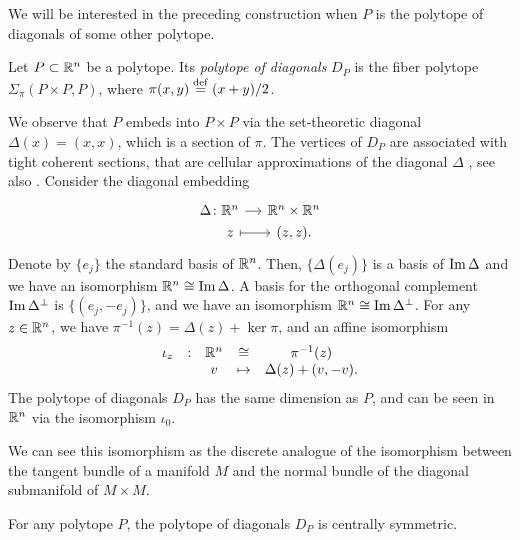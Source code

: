 We will be interested in the preceding construction when $P$ is the polytope of diagonals of some other polytope. 

\begin{definition}
    Let $P\subset \mathbb{R}^n$ be a polytope. 
    Its \emph{polytope of diagonals} $D_P$ is the fiber polytope $\Sigma_\pi(P\times P, P)$, where $\pi(x,y)\stackrel{\mathrm{def}}{=} (x+y)/2$.
\end{definition}

We observe that $P$ embeds into $P\times P$ via the set-theoretic diagonal $\Delta (x)=(x,x)$, which is a section of $\pi$. 
The vertices of $D_P$ are associated with tight coherent sections, that are cellular approximations of the diagonal $\Delta$ \cite[Proposition 5]{MTTV19}, see also \cite[Proposition 1.1]{GLA21}. 
Consider the diagonal embedding
\[
\begin{tikzcd}[row sep=0, column sep=small]
\Delta \colon \R^n \arrow{r} & \R^n \times \R^n \\
\phantom{\Delta \colon} z \arrow[r, |->] & (z,z).
\end{tikzcd}
\]
Denote by $\{e_j\}$ the standard basis of $\mathbb{R}^n$. 
Then, $\{\Delta (e_j)\}$ is a basis of $\operatorname{\mathrm{Im}} \Delta$ and we have an isomorphism $\mathbb{R}^n \cong \operatorname{\mathrm{Im}} \Delta$. 
A basis for the orthogonal complement $\operatorname{\mathrm{Im}} \Delta^{\bot}$ is $\{(e_j,-e_j)\}$, and we have an isomorphism $\mathbb{R}^n \cong \operatorname{\mathrm{Im}} \Delta^{\bot}$. 
For any $z \in \mathbb{R}^n$, we have $\pi^{-1}(z)=\Delta(z)+\ker \pi$, and an affine isomorphism
\begin{equation} \label{eq:D_P-iso}
\begin{matrix}
 \iota_z & : & \mathbb{R}^n  & \cong & \pi^{-1}(z) \\
 & & v  & \mapsto & \Delta(z)+(v,-v).
\end{matrix}
\end{equation}
The polytope of diagonals $D_P$ has the same dimension as $P$, and can be seen in $\mathbb{R}^n$ via the isomorphism $\iota_0$. 

\begin{remark}
We can see this isomorphism as the discrete analogue of the isomorphism between the tangent bundle of a manifold $M$ and the normal bundle of the diagonal submanifold of $M\times M$. 
\end{remark}

\begin{proposition}
    For any polytope $P$, the polytope of diagonals $D_P$ is centrally symmetric. 
\end{proposition}

